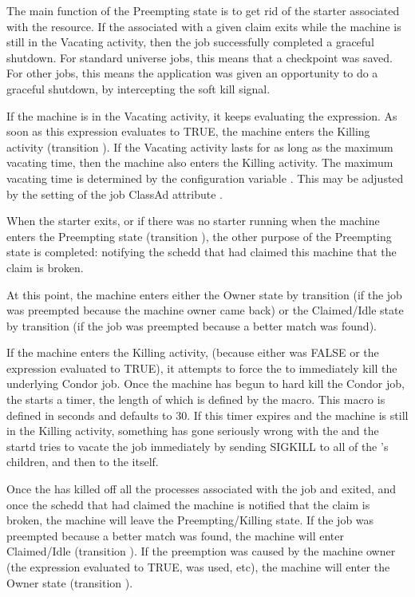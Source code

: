 The main function of the Preempting state is to get rid of the starter
associated with the resource.  If the  associated with
a given claim exits while the machine is still in the Vacating
activity, then the job successfully completed a graceful shutdown.
For standard universe jobs, this means that a checkpoint was saved.
For other jobs, this means the application was given an opportunity to
do a graceful shutdown, by intercepting the soft kill signal.

If the machine is in the Vacating activity, it keeps evaluating the 
 expression.
As soon as this expression evaluates to TRUE,
the machine enters the Killing activity (transition ).
If the Vacating activity lasts for as long as the maximum
vacating time, then the machine also enters the Killing activity.
The maximum vacating time is determined by the configuration variable
.
This may be adjusted by the setting of the job ClassAd
attribute .

When the starter exits, or if there was no starter running when the
machine enters the Preempting state (transition ),
the other purpose of the Preempting state is completed:
notifying the schedd that had claimed this machine that the claim is
broken.

At this point, the machine enters either the Owner state by
transition  (if the job was preempted because the machine
owner came back) or the Claimed/Idle state by transition 
(if the job was preempted because a better match was found).

If the machine enters the Killing activity, (because either
 was FALSE or the  expression evaluated
to TRUE), it attempts to force the  to immediately
kill the underlying Condor job.
Once the machine has begun to hard kill the Condor job, the
 starts a timer, the length of which is defined by the
 \label{param:KillingTimeout} macro.
This macro is defined in seconds and defaults to 30.
If this timer expires and the machine is still in
the Killing activity, something has gone seriously wrong with the
 and the startd tries to vacate the job immediately by
sending SIGKILL to all of the 's children, and then to
the  itself.

Once the  has killed off all the processes associated
with the job and exited, and once the schedd that had claimed the
machine is notified that the claim is broken, the machine will leave
the Preempting/Killing state.
If the job was preempted because a better match was found, the machine
will enter Claimed/Idle (transition ).
If the preemption was caused by the machine owner (the 
expression evaluated to TRUE,  was used, etc), the
machine will enter the Owner state (transition ).


